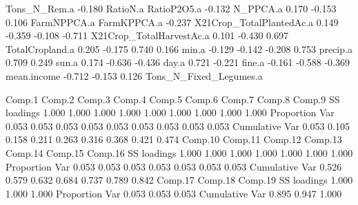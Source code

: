 \documentclass{report}
\begin{document}
\begin{Schunk}
\begin{Soutput}
Tons_N_Rem.a             -0.180                                         
RatioN.a                                                                
RatioP2O5.a                      -0.132                                 
N_PPCA.a                  0.170  -0.153   0.106                         
FarmNPPCA.a                                                             
FarmKPPCA.a              -0.237                                         
X21Crop_TotalPlantedAc.a          0.149          -0.359  -0.108  -0.711 
X21Crop_TotalHarvestAc.a          0.101          -0.430           0.697 
TotalCropland.a           0.205  -0.175           0.740   0.166         
min.a                            -0.129  -0.142  -0.208   0.753         
precip.a                          0.709           0.249                 
sun.a                     0.174          -0.636          -0.436         
day.a                                     0.721          -0.221         
fine.a                   -0.161  -0.588                  -0.369         
mean.income              -0.712          -0.153   0.126                 
Tons_N_Fixed_Legumes.a                                                  

               Comp.1 Comp.2 Comp.3 Comp.4 Comp.5 Comp.6 Comp.7 Comp.8 Comp.9
SS loadings     1.000  1.000  1.000  1.000  1.000  1.000  1.000  1.000  1.000
Proportion Var  0.053  0.053  0.053  0.053  0.053  0.053  0.053  0.053  0.053
Cumulative Var  0.053  0.105  0.158  0.211  0.263  0.316  0.368  0.421  0.474
               Comp.10 Comp.11 Comp.12 Comp.13 Comp.14 Comp.15 Comp.16
SS loadings      1.000   1.000   1.000   1.000   1.000   1.000   1.000
Proportion Var   0.053   0.053   0.053   0.053   0.053   0.053   0.053
Cumulative Var   0.526   0.579   0.632   0.684   0.737   0.789   0.842
               Comp.17 Comp.18 Comp.19
SS loadings      1.000   1.000   1.000
Proportion Var   0.053   0.053   0.053
Cumulative Var   0.895   0.947   1.000
\end{Soutput}
\end{Schunk}
\end{document}
